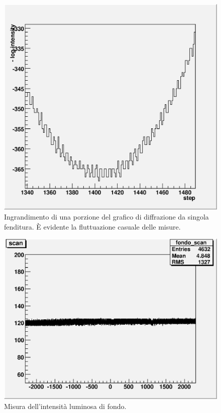 \documentclass[italian,a4paper]{article}
\begin{document}
\begin{figure}[ph]\centering
\includegraphics[scale=.6]{dentini.eps}
\caption{Ingrandimento di una porzione del grafico di diffrazione da singola fenditura. \`{E} evidente la fluttuazione casuale delle misure.}\label{dentini}
\end{figure}
\begin{figure}[ph]\centering
\includegraphics[scale=.6]{fondo.hist.eps}
\caption{Misura dell'intensità luminosa di fondo.}\label{fondo}
\end{figure}
\end{document}
